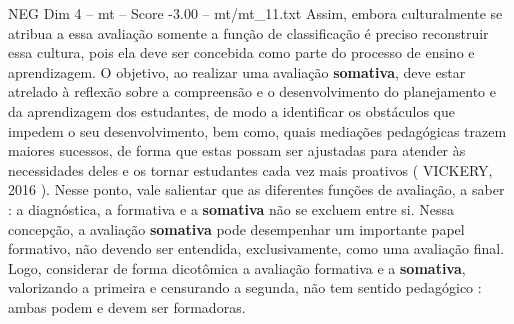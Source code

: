 \begin{textsample}{NEG Dim 4 – mt – Score -3.00 – mt/mt\_11.txt}
Assim, embora culturalmente se atribua a essa avaliação somente a função de classificação é preciso reconstruir essa cultura, pois ela deve ser concebida como parte do processo de ensino e aprendizagem.
O objetivo, ao realizar uma avaliação \textbf{somativa}, deve estar atrelado à reflexão sobre a compreensão e o desenvolvimento do planejamento e da aprendizagem dos estudantes, de modo a identificar os obstáculos que impedem o seu desenvolvimento, bem como, quais mediações pedagógicas trazem maiores sucessos, de forma que estas possam ser ajustadas para atender às necessidades deles e os tornar estudantes cada vez mais proativos ( VICKERY, 2016 ).
Nesse ponto, vale salientar que as diferentes funções de avaliação, a saber : a diagnóstica, a formativa e a \textbf{somativa} não se excluem entre si.
Nessa concepção, a avaliação \textbf{somativa} pode desempenhar um importante papel formativo, não devendo ser entendida, exclusivamente, como uma avaliação final.
Logo, considerar de forma dicotômica a avaliação formativa e a \textbf{somativa}, valorizando a primeira e censurando a segunda, não tem sentido pedagógico : ambas podem e devem ser formadoras.

\end{textsample}
